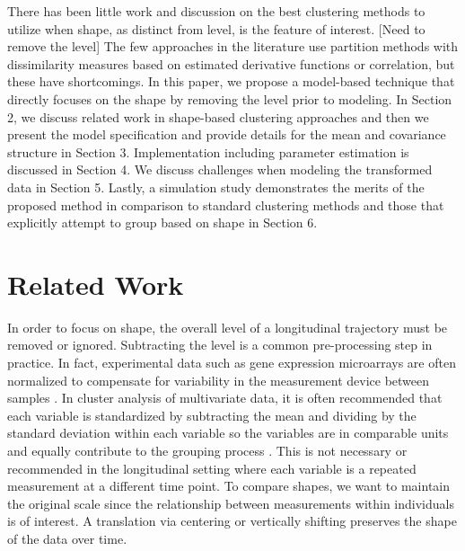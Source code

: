\documentclass[12pt]{article}
\begin{document}
There has been little work and discussion on the best clustering methods to utilize when shape, as distinct from level, is the feature of interest. [Need to remove the level] The few approaches in the literature use partition methods with dissimilarity measures based on estimated derivative functions or correlation, but these have shortcomings. In this paper, we propose a model-based technique that directly focuses on the shape by removing the level prior to modeling. In Section 2, we discuss related work in shape-based clustering approaches and then we present the model specification and provide details for the mean and covariance structure in Section 3. Implementation including parameter estimation is discussed in Section 4. We discuss challenges when modeling the transformed data in Section 5. Lastly, a simulation study demonstrates the merits of the proposed method in comparison to standard clustering methods and those that explicitly attempt to group based on shape in Section 6.

\section{Related Work}
In order to focus on shape, the overall level of a longitudinal trajectory must be removed or ignored. Subtracting the level is a common pre-processing step in practice. In fact, experimental data such as gene expression microarrays are often normalized to compensate for variability in the measurement device between samples \cite{park2003}. In cluster analysis of multivariate data, it is often recommended that each variable is standardized by subtracting the mean and dividing by the standard deviation within each variable so the variables are in comparable units and equally contribute to the grouping process \cite{everitt2009}. This is not necessary or recommended in the longitudinal setting where each variable is a repeated measurement at a different time point. To compare shapes, we want to maintain the original scale since the relationship between measurements within individuals is of interest. A translation via centering \cite{chiou2008} or vertically shifting preserves the shape of the data over time.
\end{document}
